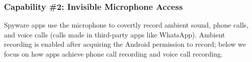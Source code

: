 

\subsubsection*{Capability \#2: Invisible Microphone Access}
\label{subsubsec:audio_recording}
Spyware apps use the microphone to covertly record
ambient sound, phone calls,
and voice calls (calls made in third-party apps like WhatsApp).
Ambient recording is enabled after acquiring the Android permission
to record; below we focus on how apps achieve phone call recording and voice call
recording.

